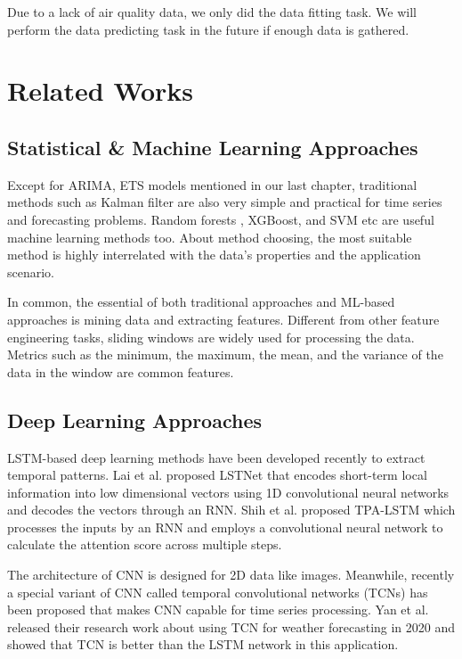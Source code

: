 \documentclass[
twocolumn,
]{ceurart}
\begin{document}
Due to a lack of air quality data, we only did the data fitting task. We will perform the data predicting task in the future if enough data is gathered.

\section{Related Works}
\subsection{Statistical \& Machine Learning Approaches}

Except for ARIMA, ETS models mentioned in our last chapter, traditional methods such as Kalman filter \cite{gomez1994estimation} are also very simple and practical for time series and forecasting problems. Random forests \cite{rouet2017machine}, XGBoost, and SVM \cite{sapankevych2009time} etc are useful machine learning methods too. About method choosing, the most suitable method is highly interrelated with the data's properties and the application scenario. 

In common, the essential of both traditional approaches and ML-based approaches is mining data and extracting features. Different from other feature engineering tasks, sliding windows are widely used for processing the data. Metrics such as the minimum, the maximum, the mean, and the variance of the data in the window are common features.

\subsection{Deep Learning Approaches}

LSTM-based deep learning methods have been developed recently to extract temporal patterns. Lai et al. proposed LSTNet \cite{lai2018modeling} that encodes short-term local information into low dimensional vectors using 1D convolutional neural networks and decodes the vectors through an RNN. Shih et al. proposed TPA-LSTM \cite{shih2019temporal}  which processes the inputs by an RNN and employs a convolutional neural network to calculate the attention score across multiple steps.

The architecture of CNN is designed for 2D data like images. Meanwhile, recently a special variant of CNN called temporal convolutional networks (TCNs) \cite{lea2016temporal} has been proposed that makes CNN capable for time series processing. Yan et al. \cite{yan2020temporal} released their research work about using TCN for weather forecasting in 2020 and showed that TCN is better than the LSTM network in this application.
\end{document}
